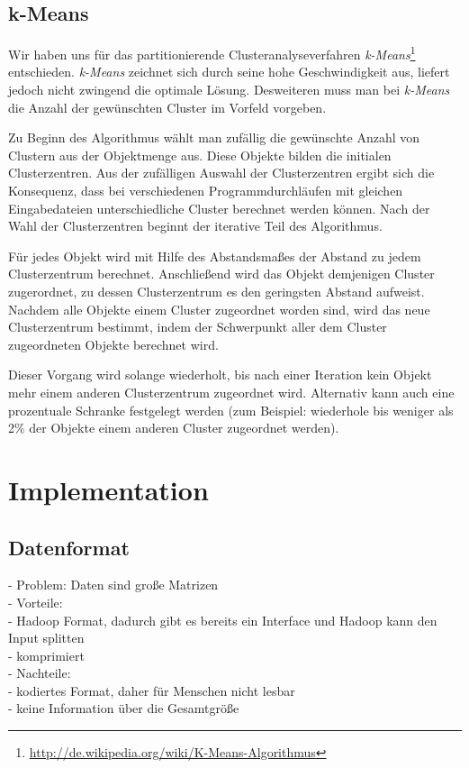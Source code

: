 \documentclass[a4paper]{llncs}
\begin{document}
\subsection{k-Means}
Wir haben uns für das partitionierende Clusteranalyseverfahren \emph{k-Means}\footnote{\url{http://de.wikipedia.org/wiki/K-Means-Algorithmus}} entschieden. \emph{k-Means} zeichnet sich durch seine hohe Geschwindigkeit aus, liefert jedoch nicht zwingend die optimale Lösung. Desweiteren muss man bei \emph{k-Means} die Anzahl der gewünschten Cluster im Vorfeld vorgeben.

Zu Beginn des Algorithmus wählt man zufällig die gewünschte Anzahl von Clustern aus der Objektmenge aus. Diese Objekte bilden die initialen Clusterzentren. Aus der zufälligen Auswahl der Clusterzentren ergibt sich die Konsequenz, dass bei verschiedenen Programmdurchläufen mit gleichen Eingabedateien unterschiedliche Cluster berechnet werden können. Nach der Wahl der Clusterzentren beginnt der iterative Teil des Algorithmus.

Für jedes Objekt wird mit Hilfe des Abstandsmaßes der Abstand zu jedem Clusterzentrum berechnet. Anschließend wird das Objekt demjenigen Cluster zugerordnet, zu dessen Clusterzentrum es den geringsten Abstand aufweist.
Nachdem alle Objekte einem Cluster zugeordnet worden sind, wird das neue Clusterzentrum bestimmt, indem der Schwerpunkt aller dem Cluster zugeordneten Objekte berechnet wird.

Dieser Vorgang wird solange wiederholt, bis nach einer Iteration kein Objekt mehr einem anderen Clusterzentrum zugeordnet wird. Alternativ kann auch eine prozentuale Schranke festgelegt werden (zum Beispiel: wiederhole bis weniger als 2\% der Objekte einem anderen Cluster zugeordnet werden).

\section{Implementation}

\subsection{Datenformat}
- Problem: Daten sind große Matrizen\\
- Vorteile:\\
    - Hadoop Format, dadurch gibt es bereits ein Interface und Hadoop kann den Input splitten\\
    - komprimiert\\
- Nachteile:\\
    - kodiertes Format, daher für Menschen nicht lesbar\\
    - keine Information über die Gesamtgröße
\end{document}
